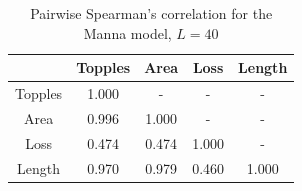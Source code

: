\begin{table}[htbp]
    \centering
    \begin{tabular}{ccccc}\toprule
         &  Topples&  Area&  Loss& Length\\\midrule
         Topples&  1.000&  -&  -& -\\
         Area&  0.996&  1.000&  -& -\\
         Loss&  0.474&  0.474&  1.000& -\\
         Length&  0.970&  0.979&  0.460& 1.000\\ \bottomrule
    \end{tabular}
    \caption{Pairwise Spearman's correlation for the Manna model, $L=40$}
    \label{tab:corrManna40}
\end{table}
